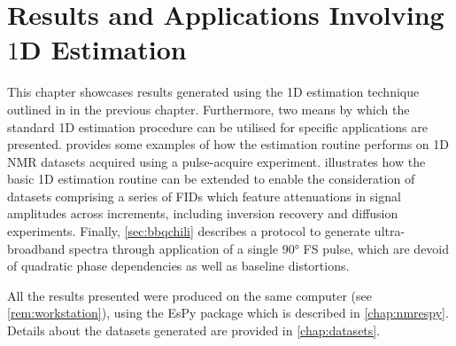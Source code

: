 \chapter{Results and Applications Involving $1$D Estimation}
\label{chap:results}

This chapter showcases results generated using the \ac{1D} estimation
technique outlined in in the previous chapter. Furthermore, two means by
which the standard \ac{1D} estimation procedure can be utilised for
specific applications are presented.
 provides some examples of how the estimation
routine performs on \ac{1D} \ac{NMR} datasets acquired using a pulse-acquire
experiment.  illustrates how the basic \ac{1D} estimation routine
can be extended to enable the consideration of datasets comprising a series of
\acp{FID} which feature attenuations in signal amplitudes across increments,
including inversion recovery and diffusion experiments. Finally,
\cref{sec:bbqchili} describes a protocol to generate ultra-broadband spectra
through application of a single \ang{90} \acl{FS} pulse, which are devoid of
quadratic phase dependencies as well as baseline distortions.

All the results presented were produced on the same computer (see
\cref{rem:workstation}), using the \ac{EsPy} package which is
described in \cref{chap:nmrespy}. Details about the datasets generated are
provided in \cref{chap:datasets}.





